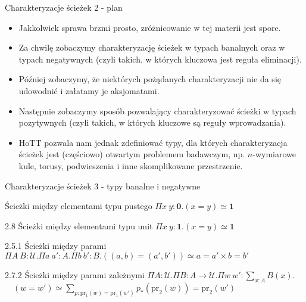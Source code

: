 \documentclass{beamer}
\newcommand{\U}{\mathcal{U}}
\newcommand{\prl}{\text{pr}_1}
\newcommand{\prr}{\text{pr}_2}
\begin{document}
\begin{frame}{Charakteryzacje ścieżek 2 - plan}
\begin{itemize}
	\item Jakkolwiek sprawa brzmi prosto, zróżnicowanie w tej materii jest spore.
	\item Za chwilę zobaczymy charakteryzację ścieżek w typach banalnych oraz w typach negatywnych (czyli takich, w których kluczowa jest reguła eliminacji).
	\item Później zobaczymy, że niektórych pożądanych charakteryzacji nie da się udowodnić i załatamy je aksjomatami.
	\item Następnie zobaczymy sposób pozwalający charakteryzować ścieżki w typach pozytywnych (czyli takich, w których kluczowe są reguły wprowadzania).
	\item HoTT pozwala nam jednak zdefiniować typy, dla których charakteryzacja ścieżek jest (częściowo) otwartym problemem badawczym, np. $n$-wymiarowe kule, torusy, podwieszenia i inne skomplikowane przestrzenie.
\end{itemize}
\end{frame}

\begin{frame}{Charakteryzacje ścieżek 3 - typy banalne i negatywne}

\begin{block}{Ścieżki między elementami typu pustego}
$\Pi x\ y : \textbf{0}. (x = y) \simeq \textbf{1}$
\end{block}

\begin{block}{2.8 Ścieżki między elementami typu unit}
$\Pi x\ y : \textbf{1}. (x = y) \simeq \textbf{1}$
\end{block}

\begin{block}{2.5.1 Ścieżki między parami}
$\Pi A\ B : \U. \Pi a\ a' : A. \Pi b\ b': B. ((a, b) = (a', b')) \simeq a = a' \times b = b'$
\end{block}

\begin{block}{2.7.2 Ścieżki między parami zależnymi}
$\Pi A : \U. \Pi B : A \to \U. \Pi w\ w' : \sum_{x : A} B(x).$ \\
$\displaystyle \quad (w = w') \simeq \sum_{p : \prl(w) = \prl(w')} p_*(\prr(w)) = \prr(w')$
\end{block}

\end{frame}
\end{document}
